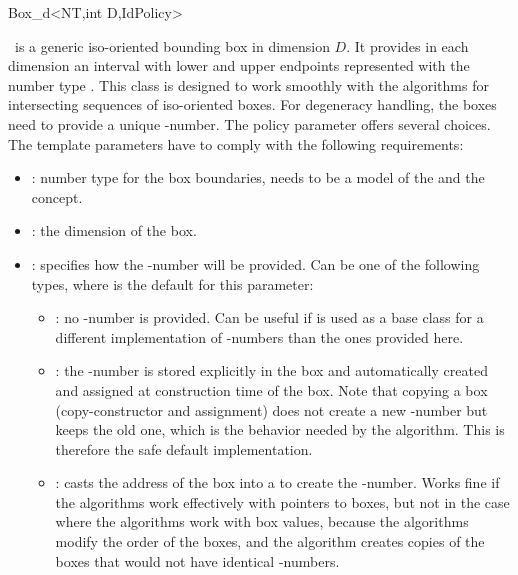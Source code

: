 

\begin{ccRefClass}{Box_d<NT,int D,IdPolicy>}
\ccDefinition

\ccRefName\ is a generic iso-oriented bounding box in dimension $D$.
It provides in each dimension an interval with lower and upper
endpoints represented with the number type .  This class is
designed to work smoothly with the algorithms for intersecting
sequences of iso-oriented boxes. For degeneracy handling, the boxes
need to provide a unique -number. The policy parameter
 offers several choices. The template parameters have to
comply with the following requirements:

\begin{itemize}
  \item
    : number type for the box boundaries, needs to be a model
    of the  and the  concept.
  \item
    : the dimension of the box.
  \item
    : specifies how the -number will be
    provided. Can be one of the following types, where
     is the default for this parameter:
    \begin{itemize}
      \item
        : no -number is provided. Can be useful
        if  is used as a base class for a different
        implementation of -numbers than the ones provided
        here.
      \item
        : the -number is stored explicitly in
        the box and automatically created and assigned at construction
        time of the box. Note that copying a box (copy-constructor and
        assignment) does not create a new -number but keeps
        the old one, which is the behavior needed by the
         algorithm. This is therefore
        the safe default implementation. 
      \item
        : casts the address of the box into a
         to create the -number. Works fine 
        if the  algorithms work effectively with pointers
        to boxes, but not in the case where the algorithms work with
        box values, because the algorithms modify the order of the
        boxes, and the  algorithm
        creates copies of the boxes that would not have identical
        -numbers.  
    \end{itemize}
\end{itemize}


\end{ccRefClass}

